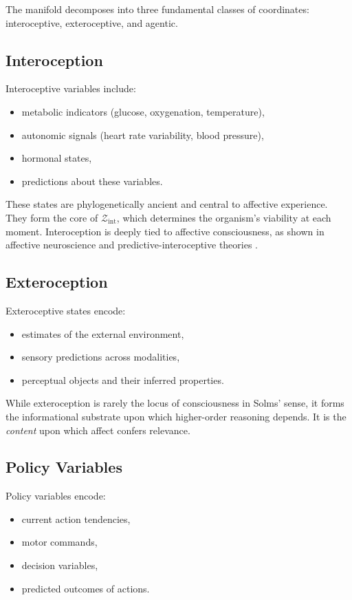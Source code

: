 \documentclass[12pt,oneside]{book}
\theoremstyle{plain}
\theoremstyle{definition}
\let\citep\parencite
\begin{document}
The manifold decomposes into three fundamental classes of coordinates:
interoceptive, exteroceptive, and agentic.

\subsection*{Interoception}

Interoceptive variables include:
\begin{itemize}
    \item metabolic indicators (glucose, oxygenation, temperature),
    \item autonomic signals (heart rate variability, blood pressure),
    \item hormonal states,
    \item predictions about these variables.
\end{itemize}

These states are phylogenetically ancient and central to affective experience.
They form the core of $\mathcal{Z}_{\mathrm{int}}$, which determines the
organism’s viability at each moment.
Interoception is deeply tied to affective consciousness, as shown in
affective neuroscience and predictive-interoceptive theories
\citep{panksepp1998affective,barrett2017interoception}.

\subsection*{Exteroception}

Exteroceptive states encode:
\begin{itemize}
    \item estimates of the external environment,
    \item sensory predictions across modalities,
    \item perceptual objects and their inferred properties.
\end{itemize}

While exteroception is rarely the locus of consciousness in Solms’ sense,
it forms the informational substrate upon which higher-order reasoning depends.
It is the \emph{content} upon which affect confers relevance.

\subsection*{Policy Variables}

Policy variables encode:
\begin{itemize}
    \item current action tendencies,
    \item motor commands,
    \item decision variables,
    \item predicted outcomes of actions.
\end{itemize}
\end{document}
